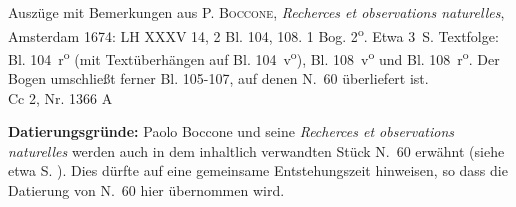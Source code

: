 \begin{ledgroupsized}[r]{114mm}%
\footnotesize%
\pstart \parindent -6mm%
%
Auszüge mit Bemerkungen aus \cite{00318}\textsc{P. Boccone}, \textit{Recherces et observations naturelles}, \mbox{Amsterdam} 1674:
LH XXXV 14, 2 Bl. 104, 108. 1 Bog. 2\textsuperscript{o}. Etwa 3\, S.
Textfolge: Bl. 104~r\textsuperscript{o} (mit Textüberhängen
 auf Bl. 104~v\textsuperscript{o}), Bl. 108~v\textsuperscript{o} und Bl. 108~r\textsuperscript{o}.
Der Bogen umschließt ferner Bl. 105-107, auf denen N.~60 %
überliefert ist.\\%
Cc 2, Nr. 1366 A %
\pend%
\end{ledgroupsized}%
\vspace{4mm}%
\begin{ledgroup}%
\footnotesize%
\pstart%
\noindent%
\footnotesize{\textbf{Datierungsgr\"{u}nde:}
Paolo Boccone und seine \textit{Recherces et observations naturelles} werden auch in dem inhaltlich verwandten Stück N.~60 %
erwähnt (siehe etwa S. ). Dies dürfte auf eine gemeinsame Entstehungszeit hinweisen, so dass die Datierung von N.~60
hier übernommen wird.
}%
\pend%
\end{ledgroup}%
\vspace{4mm}%
